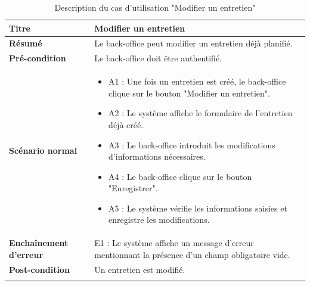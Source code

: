 \begin{longtable}[c]{
    |p{}|
    |p{}|
}
    \hline
    \textbf{Titre}
    &   Modifier un entretien\\
    \hline
    \textbf{Résumé}
    & Le back-office peut modifier un entretien déjà planifié. \\
    \hline
     \textbf{Pré-condition}
    & Le back-office doit être authentifié.\\
    \hline
     \textbf{Scénario normal}
    & \begin{itemize}
        \item A1 : Une fois un entretien est créé, le back-office clique sur le bouton "Modifier un entretien". 
        \item A2 : Le système affiche le formulaire de l'entretien déjà créé.
        \item A3 : Le back-office introduit les modifications d'informations nécessaires.
        \item A4 : Le back-office clique sur le bouton "Enregistrer".
        \item A5 : Le système vérifie les informations saisies et enregistre les modifications.
    \end{itemize}\\
    \hline
    \textbf{Enchaînement d'erreur}
    & E1 : Le système affiche un message d'erreur mentionnant la présence d'un champ obligatoire vide.\\
    \hline
    \textbf{Post-condition}
    & Un entretien est modifié.\\
    \hline
\caption{Description du cas d'utilisation "Modifier un entretien"}
\label{tab:desc_modif_entretien}
\end{longtable} 

